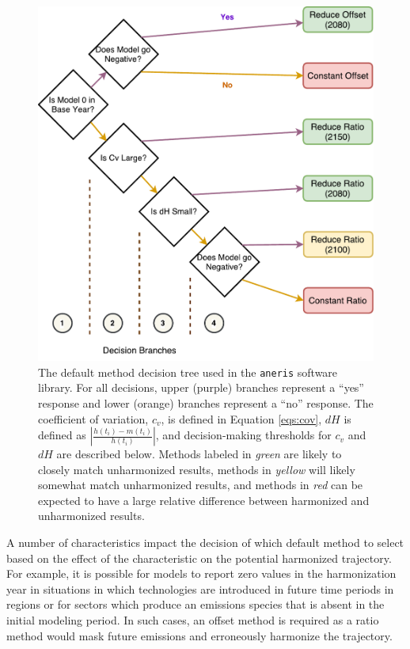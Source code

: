 \documentclass[review]{elsarticle}
\newcommand{\code}[1]{\lstinline[basicstyle=\ttfamily\color{black}]|#1|}
\begin{document}
\begin{figure}
  \begin{center}
    \includegraphics[width=\textwidth]{decision_tree.pdf}
    \caption[]{
      \label{fig:decision_tree}
      The default method decision tree used in the \code{aneris} software
      library. For all decisions, upper (purple) branches represent a ``yes''
      response and lower (orange) branches represent a ``no'' response. The
      coefficient of variation, $c_v$, is defined in Equation \ref{eqs:cov},
      $dH$ is defined as $\left|\frac{h(t_i) - m(t_i)}{h(t_i)}\right|$, and
      decision-making thresholds for $c_v$ and $dH$ are described below. Methods
      labeled in \textit{green} are likely to closely match unharmonized
      results, methods in \textit{yellow} will likely somewhat match
      unharmonized results, and methods in \textit{red} can be expected to have
      a large relative difference between harmonized and unharmonized results.}
  \end{center}
\end{figure}

A number of characteristics impact the decision of which default method to
select based on the effect of the characteristic on the potential harmonized
trajectory. For example, it is possible for models to report zero values in the
harmonization year in situations in which technologies are introduced in future
time periods in regions or for sectors which produce an emissions species that
is absent in the initial modeling period. In such cases, an offset method is
required as a ratio method would mask future emissions and erroneously harmonize
the trajectory. 
\end{document}
